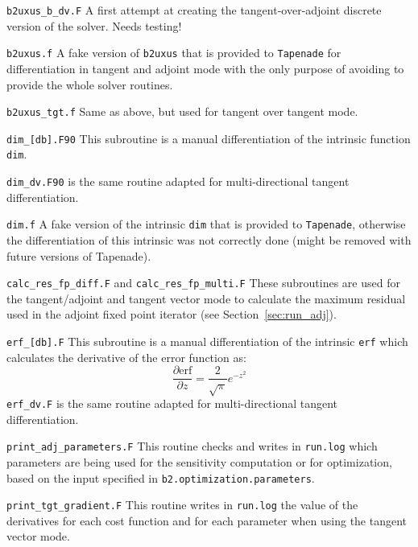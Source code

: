 \begin{description}
  \item{\tt b2uxus\_b\_dv.F} A first attempt at creating the tangent-over-adjoint discrete version of the solver. Needs testing!

  \item{\tt b2uxus.f} A fake version of {\tt b2uxus} that is provided to {\tt Tapenade} for differentiation in tangent and adjoint mode with the only purpose of avoiding to provide the whole solver routines.

  \item{\tt b2uxus\_tgt.f} Same as above, but used for tangent over tangent mode.

  \item{\tt dim\_[db].F90} This subroutine is a manual differentiation of the intrinsic function {\tt dim}.

  \item {\tt dim\_dv.F90} is the same routine adapted for multi-directional tangent differentiation.

  \item {\tt dim.f} A fake version of the intrinsic {\tt dim} that is provided to {\tt Tapenade}, otherwise the differentiation of this intrinsic was not correctly done (might be removed with future versions of Tapenade).

  \item {\tt calc\_res\_fp\_diff.F} and {\tt calc\_res\_fp\_multi.F} These subroutines are used for the tangent/adjoint and tangent vector mode to calculate the maximum residual used in the adjoint fixed point iterator (see Section~\ref{sec:run_adj}).

  \item{\tt erf\_[db].F} This subroutine is a manual differentiation of the intrinsic {\tt erf} which calculates the derivative of the error function as:
    \begin{equation*}
      \frac{\partial \mathrm{erf}}{\partial z}=\frac{2}{\sqrt{\pi}}e^{-z^2}
    \end{equation*}
    {\tt erf\_dv.F} is the same routine adapted for multi-directional tangent differentiation.

  \item {\tt print\_adj\_parameters.F} This routine checks and writes in {\tt run.log} which parameters are being used for the sensitivity computation or for optimization, based on the input specified in {\tt b2.optimization.parameters}.

  \item {\tt print\_tgt\_gradient.F} This routine writes in {\tt run.log} the value of the derivatives for each cost function and for each parameter when using the tangent vector mode.


\end{description}

